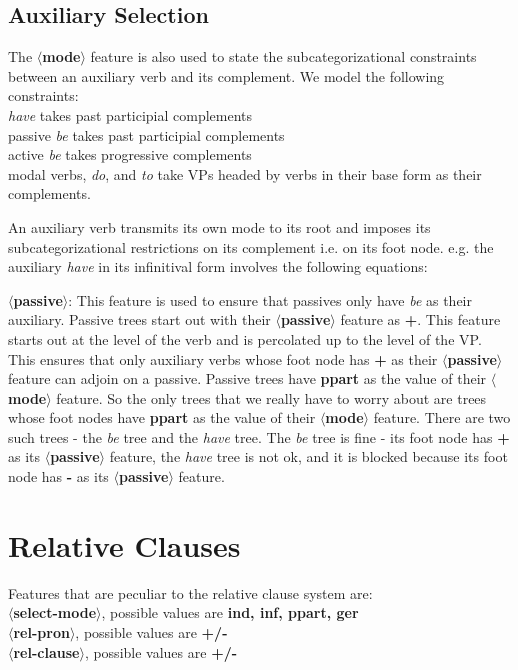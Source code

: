 \subsection{Auxiliary Selection}
The {\bf $\langle$mode$\rangle$} feature is also used to state the
subcategorizational constraints between an auxiliary verb and its
complement. We model the following constraints:\\
{\em have} takes past participial complements\\
passive {\em be} takes past participial complements\\
active {\em be} takes progressive complements\\
modal verbs, {\em do}, and {\em to} take VPs headed by verbs in their
base form as their complements. 

An auxiliary verb transmits its own mode to its root and imposes its
subcategorizational restrictions on its complement i.e. on its foot node.
e.g. the auxiliary {\em have} in its infinitival form involves the
following equations:



{\bf $\langle$passive$\rangle$}: This feature is used to ensure 
that passives only have {\em be} as their auxiliary. Passive trees
start out with their {\bf $\langle$passive$\rangle$} feature as {\bf +}. 
This feature starts out at the level of the verb and is percolated
up to the level of the VP. This ensures that only auxiliary verbs
whose foot node has {\bf +} as their {\bf $\langle$passive$\rangle$} feature
can adjoin on a passive. Passive trees have {\bf ppart} as the
value of their {\bf $\langle$mode$\rangle$} feature. So the only trees
that we really have to worry about are trees whose foot nodes
have {\bf ppart} as the
value of their {\bf $\langle$mode$\rangle$} feature. There are two such trees
- the {\em be} tree and the {\em have} tree. The {\em be} tree is fine - its
foot node has {\bf +} as its {\bf $\langle$passive$\rangle$} feature,
the {\em have} tree is not ok, and it is blocked because its 
foot node has {\bf -} as its {\bf $\langle$passive$\rangle$} feature.

\section{Relative Clauses}
Features that are peculiar to the relative clause system are:\\
{\bf $\langle$select-mode$\rangle$}, possible values are {\bf ind, inf, ppart, ger}\\
{\bf $\langle$rel-pron$\rangle$}, possible values are {\bf +/-}\\
{\bf $\langle$rel-clause$\rangle$}, possible values are {\bf +/-}

